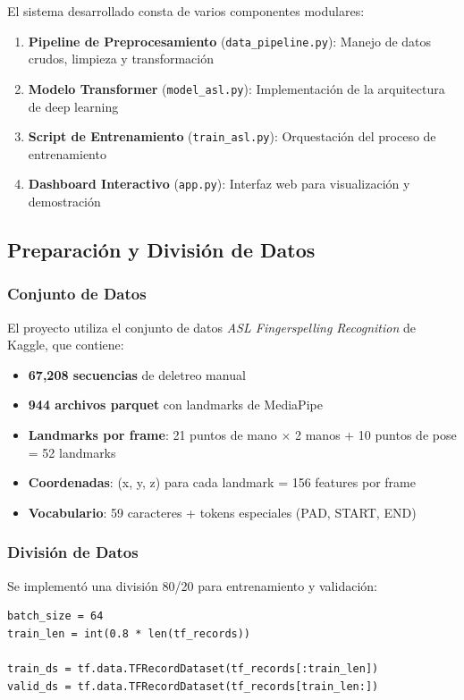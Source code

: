 \documentclass[12pt,a4paper]{article}
\begin{document}
El sistema desarrollado consta de varios componentes modulares:

\begin{enumerate}
    \item \textbf{Pipeline de Preprocesamiento} (\texttt{data\_pipeline.py}): Manejo de datos crudos, limpieza y transformación
    \item \textbf{Modelo Transformer} (\texttt{model\_asl.py}): Implementación de la arquitectura de deep learning
    \item \textbf{Script de Entrenamiento} (\texttt{train\_asl.py}): Orquestación del proceso de entrenamiento
    \item \textbf{Dashboard Interactivo} (\texttt{app.py}): Interfaz web para visualización y demostración
\end{enumerate}

\subsection{Preparación y División de Datos}

\subsubsection{Conjunto de Datos}

El proyecto utiliza el conjunto de datos \textit{ASL Fingerspelling Recognition} de Kaggle, que contiene:

\begin{itemize}
    \item \textbf{67,208 secuencias} de deletreo manual
    \item \textbf{944 archivos parquet} con landmarks de MediaPipe
    \item \textbf{Landmarks por frame}: 21 puntos de mano × 2 manos + 10 puntos de pose = 52 landmarks
    \item \textbf{Coordenadas}: (x, y, z) para cada landmark = 156 features por frame
    \item \textbf{Vocabulario}: 59 caracteres + tokens especiales (PAD, START, END)
\end{itemize}

\subsubsection{División de Datos}

Se implementó una división 80/20 para entrenamiento y validación:

\begin{lstlisting}[style=python, caption=División de datos]
batch_size = 64
train_len = int(0.8 * len(tf_records))

train_ds = tf.data.TFRecordDataset(tf_records[:train_len])
valid_ds = tf.data.TFRecordDataset(tf_records[train_len:])
\end{lstlisting}
\end{document}
